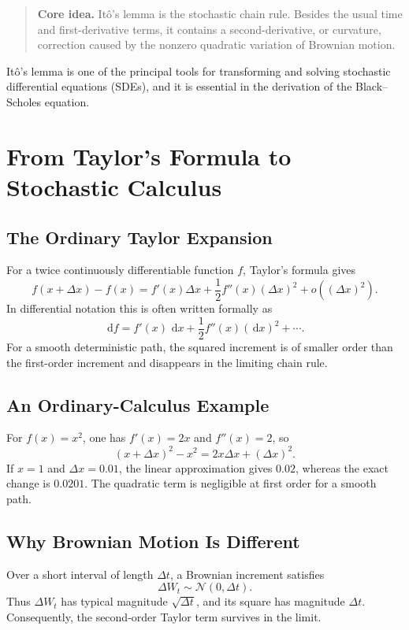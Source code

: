 \documentclass[12pt,openany]{book}
\theoremstyle{definition}
\theoremstyle{remark}
\newcommand{\dd}{\,\mathrm{d}}
\begin{document}
\begin{quote}
\colorbox{diagramBlue!8}{%
\parbox{\dimexpr\linewidth-2\fboxsep\relax}{%
\textbf{Core idea.} Itô's lemma is the stochastic chain rule.  Besides the
usual time and first-derivative terms, it contains a second-derivative, or
curvature, correction caused by the nonzero quadratic variation of Brownian
motion.}}
\end{quote}

Itô's lemma is one of the principal tools for transforming and solving
stochastic differential equations (SDEs), and it is essential in the
derivation of the Black--Scholes equation.

\section{From Taylor's Formula to Stochastic Calculus}

\subsection{The Ordinary Taylor Expansion}

For a twice continuously differentiable function \(f\), Taylor's formula
gives
\[
f(x+\Delta x)-f(x)
=f'(x)\Delta x+\frac12 f''(x)(\Delta x)^2
+o\!\left((\Delta x)^2\right).
\]
In differential notation this is often written formally as
\[
\dd f=f'(x)\,\dd x+\frac12 f''(x)(\dd x)^2+\cdots.
\]
For a smooth deterministic path, the squared increment is of smaller order
than the first-order increment and disappears in the limiting chain rule.

\subsection{An Ordinary-Calculus Example}

For \(f(x)=x^2\), one has \(f'(x)=2x\) and \(f''(x)=2\), so
\[
(x+\Delta x)^2-x^2=2x\Delta x+(\Delta x)^2.
\]
If \(x=1\) and \(\Delta x=0.01\), the linear approximation gives \(0.02\),
whereas the exact change is \(0.0201\).  The quadratic term is negligible at
first order for a smooth path.

\subsection{Why Brownian Motion Is Different}

Over a short interval of length \(\Delta t\), a Brownian increment satisfies
\[
\Delta W_t\sim\mathcal{N}(0,\Delta t).
\]
Thus \(\Delta W_t\) has typical magnitude \(\sqrt{\Delta t}\), and its
square has magnitude \(\Delta t\).  Consequently, the second-order Taylor
term survives in the limit.
\end{document}
